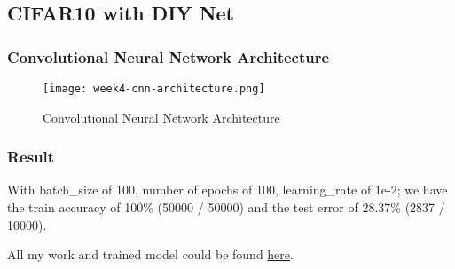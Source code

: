 \newpage
\subsection{CIFAR10 with DIY Net}
\subsubsection{Convolutional Neural Network Architecture}
\begin{figure}[!ht]
\centering
\texttt{[image: week4-cnn-architecture.png]}
\caption{Convolutional Neural Network Architecture}
\end{figure}

\subsubsection{Result}
With batch\_size of 100, number of epochs of 100, learning\_rate of 1e-2; we have the train accuracy of 100\% (50000 / 50000) and the test error of 28.37\% (2837 / 10000).

All my work and trained model could be found \href{https://gitlab.com/tlvu2697/image-classification-cifar10}{here}.